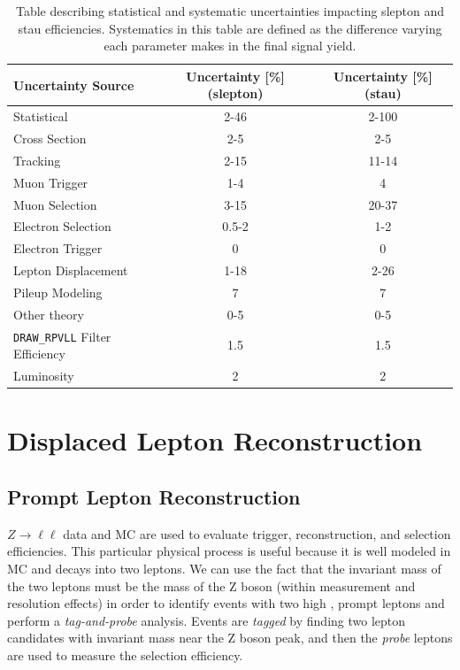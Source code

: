 \begin{table}[htb]
\small
\begin{center}
\begin{tabular}{lcc}
Uncertainty Source & Uncertainty [\%] (slepton)  &  Uncertainty [\%] (stau)  \\
\hline
Statistical				& 2-46    & 2-100                 \\
Cross Section 			& 2-5     & 2-5                 \\
Tracking				& 2-15    & 11-14                 \\
Muon Trigger			& 1-4     & 4            \\
Muon Selection	        & 3-15    & 20-37          \\
Electron Selection      & 0.5-2   & 1-2    \\
Electron Trigger	    & 0       & 0       \\
Lepton Displacement  	& 1-18    & 2-26         \\
Pileup Modeling     	& 7       & 7            \\
Other theory         	& 0-5     & 0-5              \\
\texttt{DRAW\_RPVLL} Filter Efficiency		& 1.5     & 1.5          \\
Luminosity				& 2       & 2          \\
\hline
\end{tabular}
\caption{Table describing statistical and systematic uncertainties impacting slepton and stau efficiencies. Systematics in this table are defined as the difference varying each parameter makes in the final signal yield.} 
\label{tab:siguncertainties}
\end{center}
\end{table}


\section{Displaced Lepton Reconstruction}

\subsection{Prompt Lepton Reconstruction}
$Z\rightarrow\ell\ell$ data and \ac{MC} are used to evaluate trigger, reconstruction, and selection efficiencies. This particular physical process is useful because it is well modeled in \ac{MC} and decays into two leptons. We can use the fact that the invariant mass of the two leptons must be the mass of the Z boson (within measurement and resolution effects) in order to identify events with two high \pt, prompt leptons and perform a \emph{tag-and-probe} analysis. Events are \emph{tagged} by finding two lepton candidates with invariant mass near the Z boson peak, and then the \emph{probe} leptons are used to measure the selection efficiency.

